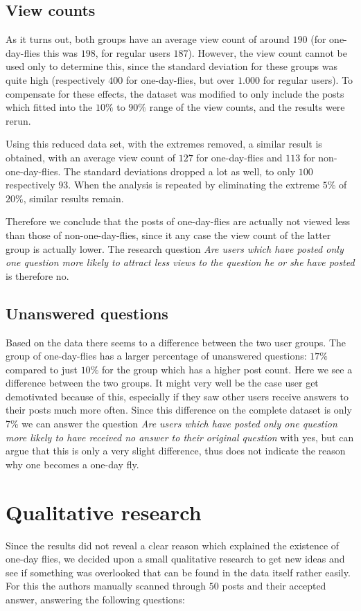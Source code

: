 \documentclass[conference]{IEEEtran}
\begin{document}
\subsection{View counts}
As it turns out, both groups have an average view count of around $190$ (for one-day-flies this was $198$, for regular users $187$). However, the view count cannot be used only to determine this, since the standard deviation for these groups was quite high (respectively $400$ for one-day-flies, but over $1.000$ for regular users). To compensate for these effects, the dataset was modified to only include the posts which fitted into the $10\%$ to $90\%$ range of the view counts, and the results were rerun.

Using this reduced data set, with the extremes removed, a similar result is obtained, with an average view count of $127$ for one-day-flies and $113$ for non-one-day-flies. The standard deviations dropped a lot as well, to only $100$ respectively $93$. When the analysis is repeated by eliminating the extreme $5\%$ of $20\%$, similar results remain.

Therefore we conclude that the posts of one-day-flies are actually not viewed less than those of non-one-day-flies, since it any case the view count of the latter group is actually lower. The research question \textit{Are users which have posted only one question more likely to attract less views to the question he or she have posted} is therefore no.

\subsection{Unanswered questions}

Based on the data there seems to a difference between the two user groups. The group of one-day-flies has a larger percentage of unanswered questions: $17\%$ compared to just $10\%$ for the group which has a higher post count. Here we see a  difference between the two groups. It might very well be the case user get demotivated because of this, especially if they saw other users receive answers to their posts much more often. Since this difference on the complete dataset is only 7\% we can answer the question \textit{Are users which have posted only one question more likely to have received no answer to their original question} with yes, but can argue that this is only a very slight difference, thus does not indicate the reason why one becomes a one-day fly.


\section{Qualitative research}\label{QualitativeResearch}
Since the results did not reveal a clear reason which explained the existence of one-day flies, we decided upon a small qualitative research to get new ideas and see if something was overlooked that can be found in the data itself rather easily.  For this the authors manually scanned through $50$ posts and their accepted answer, answering the following questions:
\end{document}
